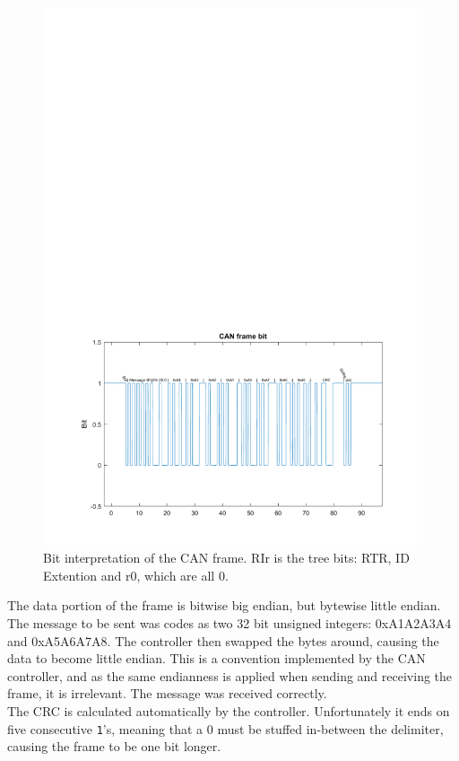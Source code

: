 \begin{figure}[h]
	\centering
	\includegraphics[width = \linewidth]{graphics/CAN_test1_message}
	\caption{Bit interpretation of the CAN frame. RIr  is the tree bits: RTR, ID Extention and r0, which are all 0.}
	\label{fig:CAN_test1_message}
\end{figure}

The data portion of the frame is bitwise big endian, but bytewise little endian. 
The message to be sent was codes as two 32 bit unsigned integers: 0xA1A2A3A4 and 0xA5A6A7A8.
The controller then swapped the bytes around, causing the data to become little endian.
This is a convention implemented by the CAN controller, and as the same endianness is applied when sending and receiving the frame, it is irrelevant. 
The message was received correctly.\\

The CRC is calculated automatically by the controller.
Unfortunately it ends on five consecutive \texttt{1}'s, meaning that a 0 must be stuffed in-between the delimiter, causing the frame to be one bit longer.\\

